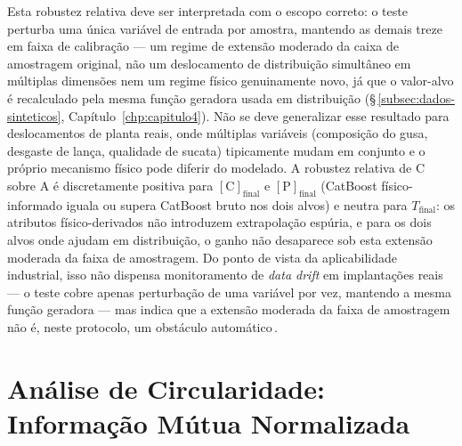 Esta robustez relativa deve ser interpretada com o escopo correto: o teste perturba uma única variável de entrada por amostra, mantendo as demais treze em faixa de calibração --- um regime de extensão moderado da caixa de amostragem original, não um deslocamento de distribuição simultâneo em múltiplas dimensões nem um regime físico genuinamente novo, já que o valor-alvo é recalculado pela mesma função geradora usada em distribuição (§\,\ref{subsec:dados-sinteticos}, Capítulo~\ref{chp:capitulo4}). Não se deve generalizar esse resultado para deslocamentos de planta reais, onde múltiplas variáveis (composição do gusa, desgaste de lança, qualidade de sucata) tipicamente mudam em conjunto e o próprio mecanismo físico pode diferir do modelado. A robustez relativa de C sobre A é discretamente positiva para $[\text{C}]_\text{final}$ e $[\text{P}]_\text{final}$ (CatBoost físico-informado iguala ou supera CatBoost bruto nos dois alvos) e neutra para $T_\text{final}$: os atributos físico-derivados não introduzem extrapolação espúria, e para os dois alvos onde ajudam em distribuição, o ganho não desaparece sob esta extensão moderada da faixa de amostragem. Do ponto de vista da aplicabilidade industrial, isso não dispensa monitoramento de \textit{data drift} em implantações reais --- o teste cobre apenas perturbação de uma variável por vez, mantendo a mesma função geradora --- mas indica que a extensão moderada da faixa de amostragem não é, neste protocolo, um obstáculo automático\,\cite{bae2020bof}.


\section{Análise de Circularidade: Informação Mútua Normalizada}
\label{sec:mi-resultados}

